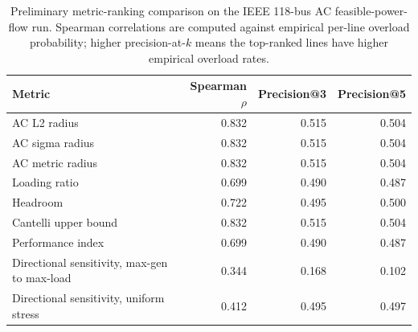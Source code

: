 \begin{table}[t]
\centering
\caption{Preliminary metric-ranking comparison on the IEEE 118-bus AC feasible-power-flow run. Spearman correlations are computed against empirical per-line overload probability; higher precision-at-$k$ means the top-ranked lines have higher empirical overload rates.\label{tab:metric-comparison}}
\footnotesize
\begin{tabularx}{\textwidth}{@{}Xrrr@{}}
\toprule
Metric & Spearman $\rho$ & Precision@3 & Precision@5 \\
\midrule
AC L2 radius & 0.832 & 0.515 & 0.504 \\
AC sigma radius & 0.832 & 0.515 & 0.504 \\
AC metric radius & 0.832 & 0.515 & 0.504 \\
Loading ratio & 0.699 & 0.490 & 0.487 \\
Headroom & 0.722 & 0.495 & 0.500 \\
Cantelli upper bound & 0.832 & 0.515 & 0.504 \\
Performance index & 0.699 & 0.490 & 0.487 \\
Directional sensitivity, max-gen to max-load & 0.344 & 0.168 & 0.102 \\
Directional sensitivity, uniform stress & 0.412 & 0.495 & 0.497 \\
\bottomrule
\end{tabularx}
\end{table}
